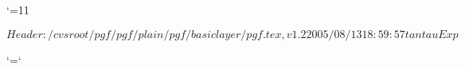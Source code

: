 %

\edef\pgfatcode{\the\catcode`\@}
\catcode`\@=11



\ProvidesPackageRCS $Header: /cvsroot/pgf/pgf/plain/pgf/basiclayer/pgf.tex,v 1.2 2005/08/13 18:59:57 tantau Exp $








\catcode`\@=\pgfatcode

\endinput
